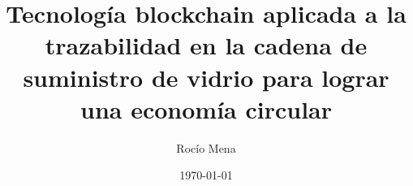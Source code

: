 \documentclass{article}
\title{Tecnología blockchain aplicada a la trazabilidad en la cadena de suministro de vidrio para lograr una economía circular}
\author{Rocío Mena}
\date{\today}
\begin{document}
\maketitle















\nocite{*} %

\printbibliography %
\end{document}
